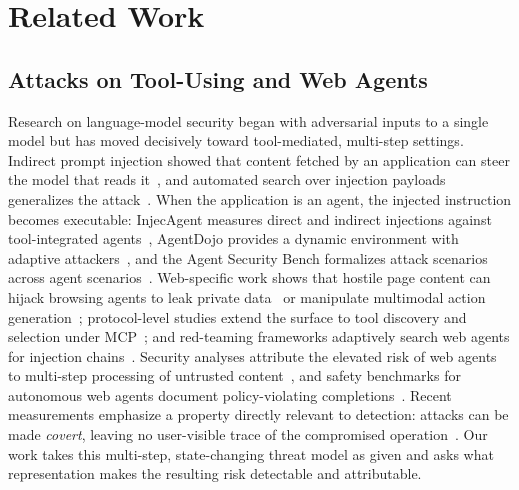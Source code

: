 \section{Related Work}

\subsection{Attacks on Tool-Using and Web Agents}
Research on language-model security began with adversarial inputs to a single model but has moved decisively toward tool-mediated, multi-step settings. Indirect prompt injection showed that content fetched by an application can steer the model that reads it~\cite{greshake2023what,liu2023prompt}, and automated search over injection payloads generalizes the attack~\cite{liu2024automatic}. When the application is an agent, the injected instruction becomes executable: InjecAgent measures direct and indirect injections against tool-integrated agents~\cite{zhan2024injecagent}, AgentDojo provides a dynamic environment with adaptive attackers~\cite{debenedetti2024agentdojo}, and the Agent Security Bench formalizes attack scenarios across agent scenarios~\cite{zhang2024agent}. Web-specific work shows that hostile page content can hijack browsing agents to leak private data~\cite{liao2024environmental} or manipulate multimodal action generation~\cite{wang2025webinject}; protocol-level studies extend the surface to tool discovery and selection under MCP~\cite{hou2025model,zhang2025security,wang2026adaptools}; and red-teaming frameworks adaptively search web agents for injection chains~\cite{syros2026muzzle}. Security analyses attribute the elevated risk of web agents to multi-step processing of untrusted content~\cite{chiang2025agents}, and safety benchmarks for autonomous web agents document policy-violating completions~\cite{tur2025safearena,levy2024stwebagentbench}. Recent measurements emphasize a property directly relevant to detection: attacks can be made \emph{covert}, leaving no user-visible trace of the compromised operation~\cite{lee2026will}. Our work takes this multi-step, state-changing threat model as given and asks what representation makes the resulting risk detectable and attributable.

